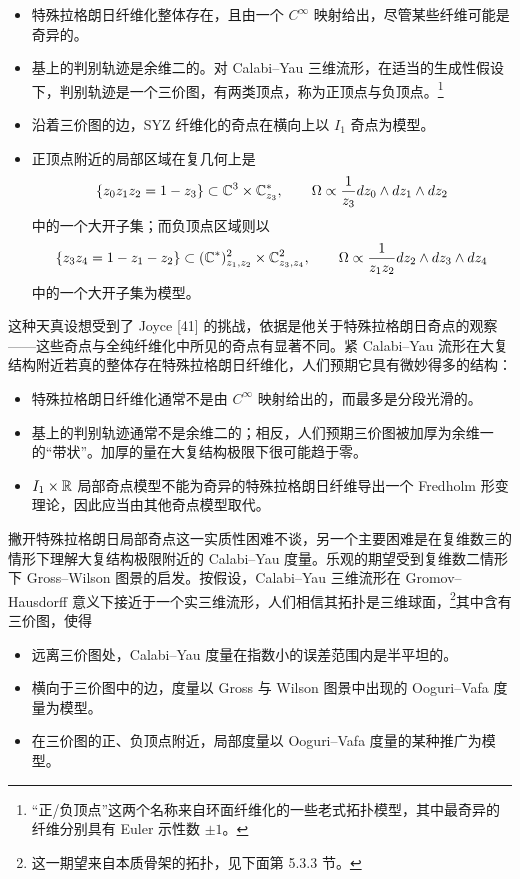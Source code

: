 \begin{itemize}
\item 特殊拉格朗日纤维化整体存在，且由一个 $C^\infty$ 映射给出，尽管某些纤维可能是奇异的。
\item 基上的判别轨迹是余维二的。对 Calabi--Yau 三维流形，在适当的生成性假设下，判别轨迹是一个三价图，有两类顶点，称为正顶点与负顶点。\footnote{“正/负顶点”这两个名称来自环面纤维化的一些老式拓扑模型，其中最奇异的纤维分别具有 Euler 示性数 $\pm1$。}
\item 沿着三价图的边，SYZ 纤维化的奇点在横向上以 $I_1$ 奇点为模型。
\item 正顶点附近的局部区域在复几何上是
\[
\{z_0z_1z_2 = 1-z_3\}\subset\mathbb{C}^3\times\mathbb{C}^*_{z_3},\qquad \Omega\propto\frac{1}{z_3}dz_0\wedge dz_1\wedge dz_2
\]
中的一个大开子集；而负顶点区域则以
\[
\{z_3z_4 = 1-z_1-z_2\}\subset(\mathbb{C}^*)^2_{z_1,z_2}\times\mathbb{C}^2_{z_3,z_4},\qquad \Omega\propto\frac{1}{z_1z_2}dz_2\wedge dz_3\wedge dz_4
\]
中的一个大开子集为模型。
\end{itemize}


这种天真设想受到了 Joyce [41] 的挑战，依据是他关于特殊拉格朗日奇点的观察------这些奇点与全纯纤维化中所见的奇点有显著不同。紧 Calabi--Yau 流形在大复结构附近若真的整体存在特殊拉格朗日纤维化，人们预期它具有微妙得多的结构：

\begin{itemize}
\item 特殊拉格朗日纤维化通常不是由 $C^\infty$ 映射给出的，而最多是分段光滑的。
\item 基上的判别轨迹通常不是余维二的；相反，人们预期三价图被加厚为余维一的“带状”。加厚的量在大复结构极限下很可能趋于零。
\item $I_1\times\mathbb{R}$ 局部奇点模型不能为奇异的特殊拉格朗日纤维导出一个 Fredholm 形变理论，因此应当由其他奇点模型取代。
\end{itemize}


撇开特殊拉格朗日局部奇点这一实质性困难不谈，另一个主要困难是在复维数三的情形下理解大复结构极限附近的 Calabi--Yau 度量。乐观的期望受到复维数二情形下 Gross--Wilson 图景的启发。按假设，Calabi--Yau 三维流形在 Gromov--Hausdorff 意义下接近于一个实三维流形，人们相信其拓扑是三维球面，\footnote{这一期望来自本质骨架的拓扑，见下面第 5.3.3 节。}其中含有三价图，使得

\begin{itemize}
\item 远离三价图处，Calabi--Yau 度量在指数小的误差范围内是半平坦的。
\item 横向于三价图中的边，度量以 Gross 与 Wilson 图景中出现的 Ooguri--Vafa 度量为模型。
\item 在三价图的正、负顶点附近，局部度量以 Ooguri--Vafa 度量的某种推广为模型。
\end{itemize}
